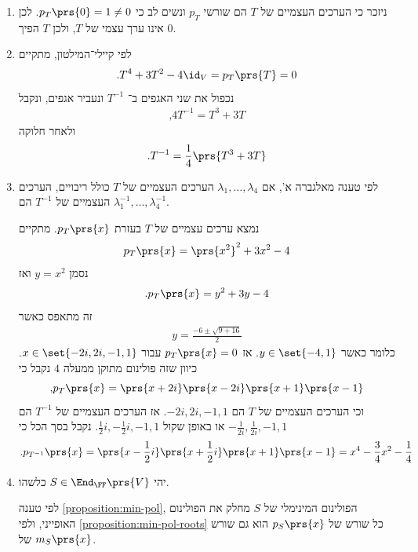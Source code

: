 \documentclass[a4paper,10pt,twoside,openany]{book}
\begin{document}
\begin{solution}
\begin{enumerate}
\item
ניזכר כי הערכים העצמיים של
$T$
הם שורשי
$p_T$
ונשים לב כי
$p_T\prs{0} = 1 \neq 0$.
לכן
$0$
אינו ערך עצמי של
$T$,
ולכן
$T$
הפיך.

\item
לפי קיילי־המילטון, מתקיים
\begin{align*}
\text{.} T^4 + 3T^2 - 4\id_V = p_T\prs{T} = 0
\end{align*}
נכפול את שני האגפים ב־%
$T^{-1}$
ונעביר אגפים, ונקבל
\begin{align*}
\text{,} 4T^{-1} = T^3 + 3T
\end{align*}
ולאחר חלוקה
\begin{align*}
\text{.} T^{-1} = \frac{1}{4} \prs{T^3 + 3T}
\end{align*}

\item
לפי טענה מאלגברה א', אם
$\lambda_1, \ldots, \lambda_4$
הערכים העצמיים של
$T$
כולל ריבויים, הערכים העצמיים של
$T^{-1}$
הם
$\lambda_1^{-1}, \ldots, \lambda_4^{-1}$.

נמצא ערכים עצמיים של
$T$
בעזרת
$p_T\prs{x}$.
מתקיים
\begin{align*}
p_T\prs{x} = \prs{x^2}^2 + 3x^2 - 4
\end{align*}
נסמן
$y = x^2$
ואז
\begin{align*}
\text{.} p_T\prs{x} = y^2 + 3y - 4
\end{align*}
זה מתאפס כאשר
\begin{align*}
y = \frac{-6 \pm \sqrt{9 + 16}}{2}
\end{align*}
כלומר כאשר
$y \in \set{-4, 1}$.
אז
$p_T\prs{x} = 0$
עבור
$x \in \set{-2i, 2i, -1, 1}$.
כיוון שזה פולינום מתוקן ממעלה
$4$
נקבל כי
\[\text{,} p_T\prs{x} = \prs{x + 2i} \prs{x - 2i} \prs{x + 1} \prs{x - 1}\]
וכי הערכים העצמיים של
$T$
הם
$-2i, 2i, -1, 1$.
אז הערכים העצמיים של
$T^{-1}$
הם
$-\frac{1}{2i}, \frac{1}{2i}, -1, 1$
או באופן שקול
$\frac{1}{2}i, - \frac{1}{2}i, -1, 1$.
נקבל בסך הכל כי
\begin{align*}
\text{.} p_{T^{-1}}\prs{x} = \prs{x - \frac{1}{2}i}\prs{x + \frac{1}{2}i}\prs{x+1}\prs{x-1} = x^4 - \frac{3}{4} x^2 - \frac{1}{4}
\end{align*}

\item
יהי
$S \in \End_\FF\prs{V}$
כלשהו.

לפי טענה
\ref{proposition:min-pol},
הפולינום המינימלי של $S$ מחלק את הפולינום האופייני, ולפי
\ref{proposition:min-pol-roots}
כל שורש של
$p_S\prs{x}$
הוא גם שורש של
$m_S\prs{x}$.


\end{enumerate}
\end{solution}
\end{document}
